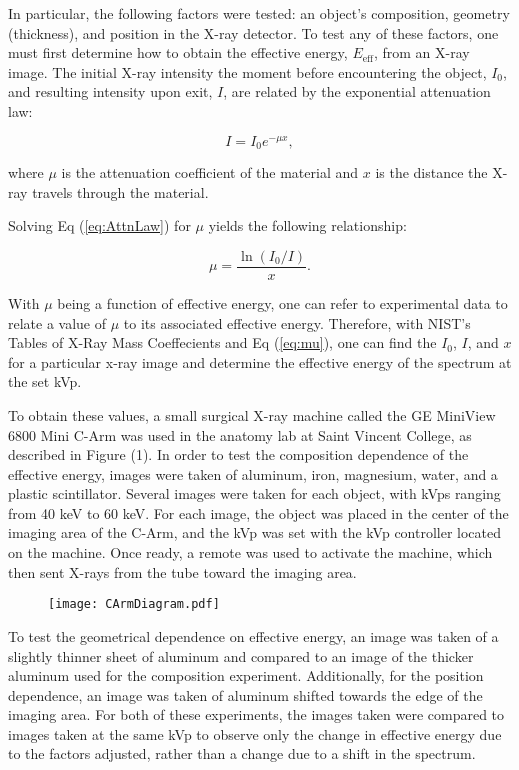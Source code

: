 In particular, the following factors were tested: an object's composition, geometry (thickness), and position in the X-ray detector. To test any of these factors, one must first determine how to obtain the effective energy, $E_{\text{eff}}$, from an X-ray image. The initial X-ray intensity the moment before encountering the object, $I_0$, and resulting intensity upon exit, $I$, are related by the exponential attenuation law:

\begin{equation}
    I = I_0e^{-\mu x},
\label{eq:AttnLaw}
\end{equation}

where $\mu$ is the attenuation coefficient of the material and $x$ is the distance the X-ray travels through the material.

Solving Eq (\ref{eq:AttnLaw}) for $\mu$ yields the following relationship:

\begin{equation}
    \mu = \frac{\ln{(I_0/I)}}{x}.
\label{eq:mu}
\end{equation}

With $\mu$ being a function of effective energy, one can refer to experimental data to relate a value of $\mu$ to its associated effective energy. Therefore, with NIST's Tables of X-Ray Mass Coeffecients \cite{NIST} and Eq (\ref{eq:mu}), one can find the $I_0$, $I$, and $x$ for a particular x-ray image and determine the effective energy of the spectrum at the set kVp.

To obtain these values, a small surgical X-ray machine called the GE MiniView 6800 Mini C-Arm was used in the anatomy lab at Saint Vincent College, as described in Figure (1). In order to test the composition dependence of the effective energy, images were taken of aluminum, iron, magnesium, water, and a plastic scintillator. Several images were taken for each object, with kVps ranging from 40 keV to 60 keV. For each image, the object was placed in the center of the imaging area of the C-Arm, and the kVp was set with the kVp controller located on the machine. Once ready, a remote was used to activate the machine, which then sent X-rays from the tube toward the imaging area.

\begin{figure}[H]
    \centering
	\texttt{[image: CArmDiagram.pdf]}
	\label{fig::CArmDiagram}
	\caption{}
\end{figure}

To test the geometrical dependence on effective energy, an image was taken of a slightly thinner sheet of aluminum and compared to an image of the thicker aluminum used for the composition experiment. Additionally, for the position dependence, an image was taken of aluminum shifted towards the edge of the imaging area. For both of these experiments, the images taken were compared to images taken at the same kVp to observe only the change in effective energy due to the factors adjusted, rather than a change due to a shift in the spectrum.

